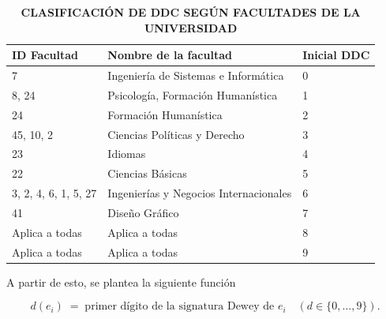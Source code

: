 \documentclass[spanish]{ieee_upb}
\begin{document}
\begin{table}[H]
    
    \centering
    \caption[Clasificación DDC según facultades de la universidad]{\bfseries CLASIFICACIÓN DE DDC SEGÚN FACULTADES DE LA UNIVERSIDAD}
    \label{tab:ddc_facultades}
    \begin{tabular}{lll}
    
        \hline
        \textbf{ID Facultad} & \textbf{Nombre de la facultad} & \textbf{Inicial DDC} \\
        \hline
        7 & Ingeniería de Sistemas e Informática & 0 \\
        
        8, 24 & Psicología, Formación Humanística & 1 \\
        
        24 & Formación Humanística & 2 \\
        
        45, 10, 2 & Ciencias Políticas y Derecho & 3 \\
        
        23 & Idiomas & 4 \\
        
        22 & Ciencias Básicas & 5 \\
        
        3, 2, 4, 6, 1, 5, 27 \hspace{1cm} & Ingenierías y Negocios Internacionales\hspace{1cm} & 6 \\
        
        41 & Diseño Gráfico & 7 \\
        
        Aplica a todas & Aplica a todas & 8 \\
        
        Aplica a todas & Aplica a todas & 9 \\
        \hline
        
    \end{tabular}
    \vspace{-4mm}
\end{table}

A partir de esto, se plantea la siguiente función 

\[
  d(e_i)\;=\;\text{primer dígito de la signatura Dewey de }e_i
  \quad (d\in\{0,\dots,9\}).
\]
\end{document}

